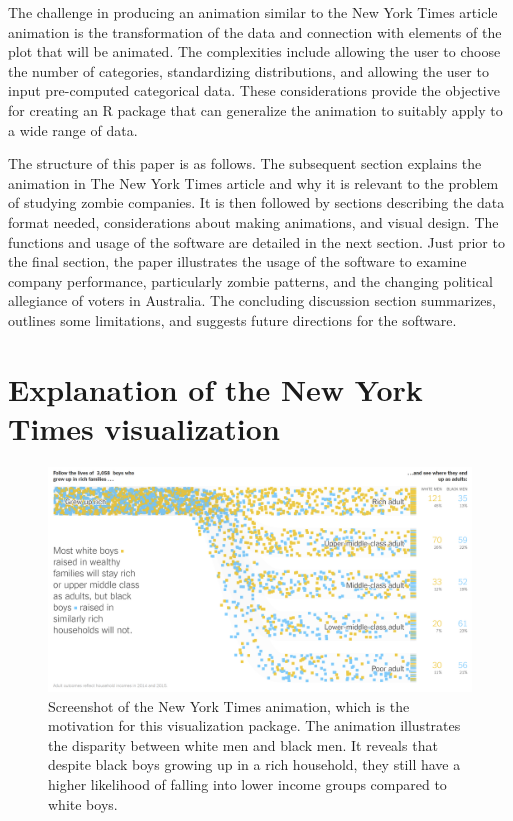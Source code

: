 The challenge in producing an animation similar to the New York Times article animation is the transformation of the data and connection with elements of the plot that will be animated. The complexities include allowing the user to choose the number of categories, standardizing distributions, and allowing the user to input pre-computed categorical data. These considerations provide the objective for creating an R package that can generalize the animation to suitably apply to a wide range of data.

The structure of this paper is as follows. The subsequent section explains the animation in The New York Times article and why it is relevant to the problem of studying zombie companies. It is then followed by sections describing the data format needed, considerations about making animations, and visual design. The functions and usage of the software are detailed in the next section. Just prior to the final section, the paper illustrates the usage of the software to examine company performance, particularly zombie patterns, and the changing political allegiance of voters in Australia. The concluding discussion section summarizes, outlines some limitations, and suggests future directions for the software.

\hypertarget{NYTvis}{%
\section{Explanation of the New York Times visualization}\label{NYTvis}}

\begin{figure}

{\centering \includegraphics[width=1\linewidth]{figures/NYT} 

}

\caption{Screenshot of the New York Times animation, which is the motivation for this visualization package. The animation illustrates the disparity between white men and black men. It reveals that despite black boys growing up in a rich household, they still have a higher likelihood of falling into lower income groups compared to white boys.}\label{fig:nyt}
\end{figure}

